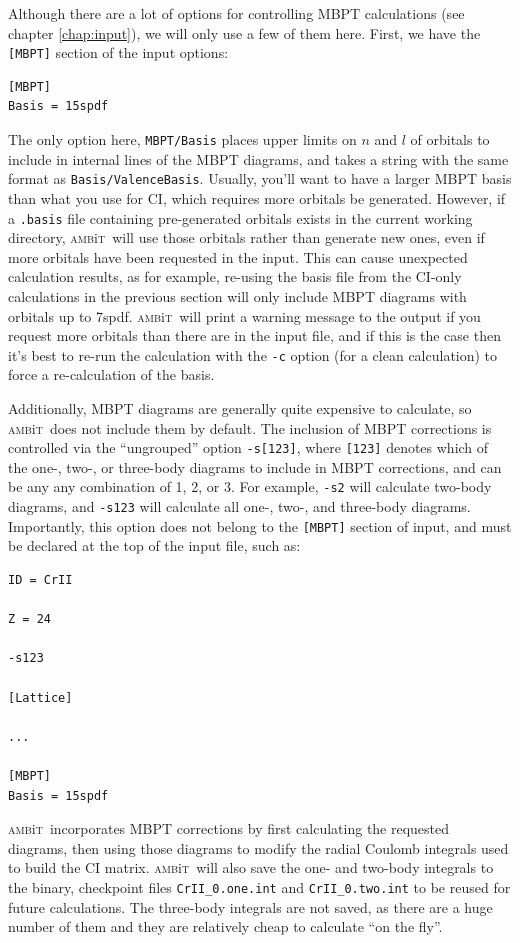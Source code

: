 \documentclass{report}
\newcommand{\ambit}{\textsc{amb}{\footnotesize i}\textsc{t}}
\begin{document}
Although there are a lot of options for controlling MBPT calculations (see chapter \ref{chap:input}), we
will only use a few of them here. First, we have the \texttt{[MBPT]} section of the input options:

\begin{verbatim}
[MBPT]
Basis = 15spdf
\end{verbatim}

The only option here, \texttt{MBPT/Basis} places upper limits on $n$ and $l$ of orbitals to include in
internal lines of the MBPT diagrams, and takes a string with the same format as
\texttt{Basis/ValenceBasis}. Usually, you'll want to have a larger MBPT basis than what
you use for CI, which requires more orbitals be generated. However, if a \texttt{.basis} file containing
pre-generated orbitals exists in the current working directory, \ambit\ will use those
orbitals rather than generate new ones, even if more orbitals have been requested in the
input. This can cause unexpected calculation results, as for example, re-using the basis
file from the CI-only calculations in the previous section will only include MBPT
diagrams with orbitals up to 7spdf. \ambit\ will print a warning message to the output if
you request more orbitals than there are in the input file, and if this is the case then
it's best to re-run the calculation with the \texttt{-c} option (for a clean calculation)
to force a re-calculation of the basis.

Additionally, MBPT diagrams are generally quite expensive to calculate, so \ambit\  does not include them
by default. The inclusion of MBPT corrections is controlled via the ``ungrouped'' option
\texttt{-s[123]}, where \texttt{[123]} denotes which of the one-, two-, or three-body diagrams to 
include in MBPT corrections, and can be any any combination of 1, 2, or 3. For example, \texttt{-s2} 
will calculate two-body diagrams, and \texttt{-s123} will calculate all one-, two-, and three-body 
diagrams. Importantly, this option does not belong to the \texttt{[MBPT]} section of input, and must be
declared at the top of the input file, such as:

\begin{verbatim}
ID = CrII

Z = 24

-s123

[Lattice]

...

[MBPT]
Basis = 15spdf
\end{verbatim}

\ambit\  incorporates MBPT corrections by first calculating the requested diagrams, then using those
diagrams to modify the radial Coulomb integrals used to build the CI matrix. \ambit\  will also save the
one- and two-body integrals to the binary, checkpoint files \texttt{CrII\_0.one.int} and
\texttt{CrII\_0.two.int} to be reused for future calculations. The three-body integrals are not saved,
as there are a huge number of them and they are relatively cheap to calculate ``on the fly''.
\end{document}
